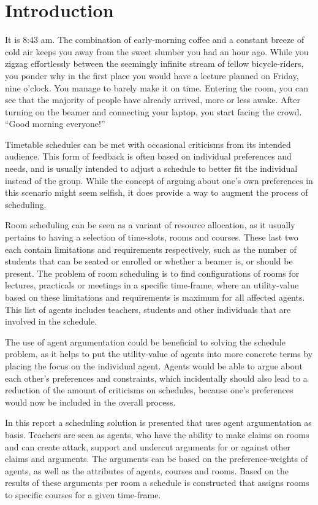 \section{Introduction}
It is 8:43 am. The combination of early-morning coffee and a constant
breeze of cold air keeps you away from the sweet slumber you had an hour
ago. While you zigzag effortlessly between the seemingly infinite stream
of fellow bicycle-riders, you ponder why in the first place you would have
a lecture planned on Friday, nine o'clock. You manage to barely make it on
time. Entering the room, you can see that the majority of people have
already arrived, more or less awake. After turning on the beamer and
connecting your laptop, you start facing the crowd. ``Good morning
everyone!''

Timetable schedules can be met with occasional criticisms from its intended
audience. This form of feedback is often based on individual preferences
and needs, and is usually intended to adjust a schedule to better fit the
individual instead of the group. While the concept of arguing about one's
own preferences in this scenario might seem selfish, it does provide a way
to augment the process of scheduling.

Room scheduling can be seen as a variant of resource allocation, as it
usually pertains to having a selection of time-slots, rooms and courses.
These last two each contain limitations and requirements respectively, such
as the number of students that can be seated or enrolled or whether a
beamer is, or should be present. The problem of room scheduling is to find
configurations of rooms for lectures, practicals or meetings in a specific
time-frame, where an utility-value based on these limitations and
requirements is maximum for all affected agents. This list of agents
includes teachers, students and other individuals that are involved in the
schedule.            

The use of agent argumentation could be beneficial to solving the schedule
problem, as it helps to put the utility-value of agents into more concrete
terms by placing the focus on the individual agent. Agents would be able to
argue about each other's preferences and constraints, which incidentally
should also lead to a reduction of the amount of criticisms on schedules,
because one's preferences would now be included in the overall process. 

In this report a scheduling solution is presented that uses agent
argumentation as basis. Teachers are seen as agents, who have the ability
to make claims on rooms and can create attack, support and undercut
arguments for or against other claims and arguments. The arguments can be
based on the preference-weights of agents, as well as the attributes of
agents, courses and rooms. Based on the results of these arguments per room
a schedule is constructed that assigns rooms to specific courses for a
given time-frame.
